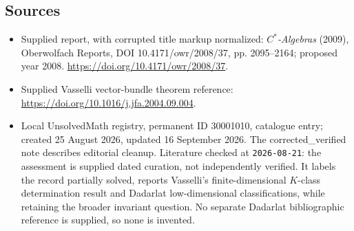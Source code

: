 \documentclass[11pt]{article}
\begin{document}
\subsection{Sources}
\begin{itemize}
\item Supplied report, with corrupted title markup normalized: \emph{$C^*$-Algebras} (2009), Oberwolfach Reports, DOI 10.4171/owr/2008/37, pp. 2095--2164; proposed year 2008. \url{https://doi.org/10.4171/owr/2008/37}.
\item Supplied Vasselli vector-bundle theorem reference: \url{https://doi.org/10.1016/j.jfa.2004.09.004}.
\item Local UnsolvedMath registry, permanent ID 30001010, catalogue entry; created 25 August 2026, updated 16 September 2026. The corrected\_verified note describes editorial cleanup. Literature checked at \texttt{2026-08-21}: the assessment is supplied dated curation, not independently verified. It labels the record partially solved, reports Vasselli's finite-dimensional $K$-class determination result and Dadarlat low-dimensional classifications, while retaining the broader invariant question. No separate Dadarlat bibliographic reference is supplied, so none is invented.
\end{itemize}
\end{document}
